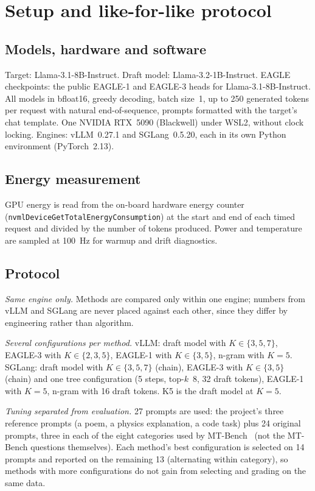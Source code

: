 \documentclass[conference]{IEEEtran}
\begin{document}
\section{Setup and like-for-like protocol}
\label{sec:protocol}

\subsection{Models, hardware and software}

Target: Llama-3.1-8B-Instruct. Draft model: Llama-3.2-1B-Instruct. EAGLE
checkpoints: the public EAGLE-1 and EAGLE-3 heads for Llama-3.1-8B-Instruct.
All models in bfloat16, greedy decoding, batch size~1, up to 250 generated
tokens per request with natural end-of-sequence, prompts formatted with the
target's chat template. One NVIDIA RTX~5090 (Blackwell) under WSL2, without
clock locking. Engines: vLLM~0.27.1 and SGLang~0.5.20, each in its own
Python environment (PyTorch~2.13).

\subsection{Energy measurement}

GPU energy is read from the on-board hardware energy counter
(\texttt{nvmlDeviceGetTotalEnergyConsumption}) at the start and end of each
timed request and divided by the number of tokens produced. Power and
temperature are sampled at 100~Hz for warmup and drift diagnostics.

\subsection{Protocol}

\emph{Same engine only.} Methods are compared only within one engine;
numbers from vLLM and SGLang are never placed against each other, since they
differ by engineering rather than algorithm.

\emph{Several configurations per method.} vLLM: draft model with
$K\in\{3,5,7\}$, EAGLE-3 with $K\in\{2,3,5\}$, EAGLE-1 with $K\in\{3,5\}$,
n-gram with $K{=}5$. SGLang: draft model with $K\in\{3,5,7\}$ (chain),
EAGLE-3 with $K\in\{3,5\}$ (chain) and one tree configuration (5 steps,
top-$k$~8, 32 draft tokens), EAGLE-1 with $K{=}5$, n-gram with 16 draft
tokens. K5 is the draft model at $K{=}5$.

\emph{Tuning separated from evaluation.} 27 prompts are used: the project's
three reference prompts (a poem, a physics explanation, a code task) plus
24 original prompts, three in each of the eight categories used by
MT-Bench~\cite{zheng2023judging} (not the MT-Bench questions themselves).
Each method's best configuration is selected on 14 prompts and reported on
the remaining 13 (alternating within category), so methods with more
configurations do not gain from selecting and grading on the same data.
\end{document}
